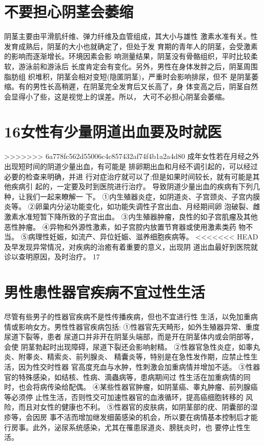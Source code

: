 \documentclass[12pt,UTF8]{ctexbook}
\begin{document}
\section{不要担心阴茎会萎缩}
阴茎主要由平滑肌纤维、弹力纤维及血管组成，其大小与雄性
激素水准有关。性发育成熟后，阴茎的大小也就确定了，但处于发
育期的青年人的阴茎，会受激素的影响而逐渐增长。环境因素会影
响测量结果，阴茎没有骨骼组织，平时比较柔软，游泳前和游泳后
长度肯定会有变化。另外，男性在身体发胖之后，阴茎周围脂肪组
织堆积，阴茎会相对变短(隐匿阴茎)，严重时会影响排尿，但不
是阴茎萎缩。有的男性长高稍遲，在阴茎完全发育后又长高了，身
体变高之后，阴茎自然会显得小了些，这是视觉上的误差。所以，
大可不必担心阴茎会萎缩。
\section{16女性有少量阴道出血要及时就医}
>>>>>>> 6a778fc562d55006c4c857432af74f4b1a2a4d80
成年女性若在月经之外出现短时间的阴道少量出血，有可能是
排卵期出血和月经不调引起的，可以经过必要的检查来明确，并进
行对症治疗就可以了;但是如果时间较长，就有可能是其他疾病引
起的，一定要及时到医院进行治疗。
导致阴道少量出血的疾病有下列几种，让我们一起来瞭解一
下。
①内生殖器炎症，如阴道炎、子宫颈炎、子宫内膜炎等。
②卵巢内分泌功能变化，如功能失调性子宫出血、月经期间卵
泡破裂、雌激素水准短暂下降所致的子宫出血。
③内生殖器肿瘤，良性的如子宫肌瘤及其他恶性肿瘤。
④异物和外源性激素，如子宫腔内放置节育器或使用激素类药
物不当。
⑤病理性妊娠，如流产、异位妊娠、滋养细胞疾病等。
<<<<<<< HEAD
及早发现异常情况，对疾病的治癒有着重要的意义，出现阴
道出血最好到医院就诊以查明原因，及时治疗。
17
\section{男性患性器官疾病不宜过性生活}
尽管有些男子的性器官疾病不是性传播疾病，但也不宜进行性
生活，以免加重病情或影响女方。男性性器官疾病包括:
①性器官先天畸形，如外生殖器异常、重度尿道下裂等，患者
尿道口并非开在阴茎头端部，而是开在阴茎体内或会阴部等，会使
阴茎勃起时出现障碍，尿道下裂还会影响射精。
②性器官急性炎症，如睾丸炎、附睾炎、精索炎、前列腺炎、
精囊炎等，特别是在急性发作期，应禁止性生活，因为性交时性器
官高度充血与水肿，性刺激会加重病情并增加不适。
③性器官的特殊感染，如结核、性病、滴蟲病等，患病期间过
性生活在加重病情的同时，也会将病传染给配偶。
④某些性器官肿瘤，如阴茎癌、睾丸肿瘤、前列腺癌等必须停
止性生活，否则性交可加速性器官的血液循环，提高癌细胞转移的
风险，而且对女性的健康也不利。
⑤性器官的皮肤病，如阴茎部的疣、阴囊部的湿疹等，会因房
事不洁而增加继发细菌感染的机会，所以要在病情基本控制后才能
行房事。此外，泌尿系统感染，尤其在罹患尿道炎、膀胱炎时，也
要停止性生活。
\end{document}
